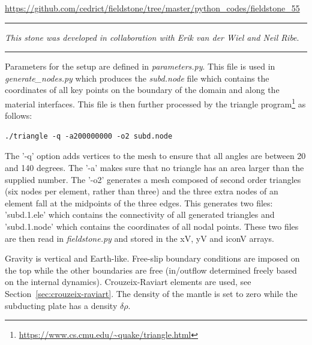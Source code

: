 

\begin{center}
\url{https://github.com/cedrict/fieldstone/tree/master/python_codes/fieldstone_55}
\end{center}

\par\noindent\rule{\textwidth}{0.4pt}

{\sl This stone was developed in collaboration with Erik van der Wiel and Neil Ribe}. 

\par\noindent\rule{\textwidth}{0.4pt}



\vspace{1cm}

Parameters for the setup are defined in {\sl parameters.py}.
This file is used in {\sl generate\_nodes.py} which produces the
{\sl subd.node} file which contains the coordinates of all key points 
on the boundary of the domain and along the material interfaces.
This file is then further processed by the triangle 
program\footnote{\url{https://www.cs.cmu.edu/~quake/triangle.html}}
as follows:
\begin{verbatim}
./triangle -q -a200000000 -o2 subd.node
\end{verbatim}
The '-q' option adds vertices to the mesh to
ensure that all angles are between 20 and 140 degrees. 
The '-a' makes sure that no triangle has an area larger than 
the supplied number. The '-o2' generates a mesh composed 
of second order triangles (six nodes per element, rather than three) and the
three extra nodes of an element fall at the midpoints of the three edges.
This generates two files: 'subd.1.ele' which contains the connectivity 
of all generated triangles and 'subd.1.node' which contains the coordinates
of all nodal points. 
These two files are then read in {\sl fieldstone.py} and stored in the xV, yV and iconV arrays.

Gravity is vertical and Earth-like. Free-slip boundary conditions are imposed on the top while 
the other boundaries are free (in/outflow determined freely based on the internal dynamics). 
Crouzeix-Raviart elements are used, see Section~\ref{sec:crouzeix-raviart}.
The density of the mantle is set to zero while the subducting plate has a density $\delta\rho$. 

